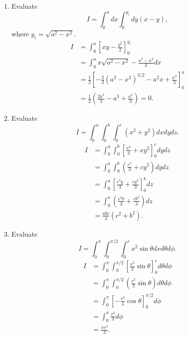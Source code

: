 \documentclass{article}
\begin{document}
\begin{enumerate}
	\item{Evaluate 
		\begin{equation*}
			I = \int_0^a dx \int_0^{y_i} dy (x-y) ,
		\end{equation*}			
		where $y_i = \sqrt{a^2 - x^2}$.
		\begin{align*}
			I &= \int_0^a \left[ xy - \frac{y^2}{2} \right]_0^{y_i} \\
			&= \int_0^a x\sqrt{a^2 - x^2} - \frac{a^2 - x^2}{2} dx \\
			&= \frac{1}{2} \left[ -\frac{2}{3} (a^2 - x^2)^{3/2} - a^2 x + \frac{x^3}{3}\right]_0^a \\
			&= \frac{1}{2} \left( \frac{2a^3}{3} - a^3 + \frac{a^3}{3} \right) = 0.
		\end{align*}
	}
	\item{Evaluate 
		\begin{equation*}
			I = \int_0^a \int_0^b \int_0^c (x^2 + y^2) dx dy dz.
		\end{equation*}			
		\begin{align*}
			I &= \int_0^a \int_0^b \left[ \frac{x^3}{3} + xy^2 \right]_0^c dy dz \\
			&= \int_0^a \int_0^b \left( \frac{c^3}{3} + cy^2 \right) dy dz \\
			&= \int_0^a \left[ \frac{c^3 y}{3} + \frac{cy^3}{3}\right]_0^b dz\\
			&= \int_0^a \left( \frac{c^3 b}{3} + \frac{cb^3}{3} \right) dz \\
			&= \frac{abc}{3} (c^2 + b^2).
		\end{align*}
	}
	\item{Evaluate 
		\begin{equation*}
			I = \int_0^{\pi} \int_0^{\pi/2} \int_0^r x^2 \sin \theta dx d\theta d\phi .
		\end{equation*}		
		\begin{align*}
			I &= \int_0^\pi \int_0^{\pi/2} \left[ \frac{x^3}{3} \sin \theta \right]_0^r d\theta d\phi \\
			&= \int_0^\pi \int_0^{\pi/2} \left( \frac{r^3}{3} \sin \theta \right) d\theta d\phi \\ 
			&= \int_0^\pi \left[ -\frac{r^3}{3} \cos \theta \right]_0^{\pi/2} d\phi \\
			&= \int_0^\pi \frac{r^3}{3} d\phi \\
			&= \frac{\pi r^3}{3} .
		\end{align*}			
	}
\end{enumerate}
\end{document}
